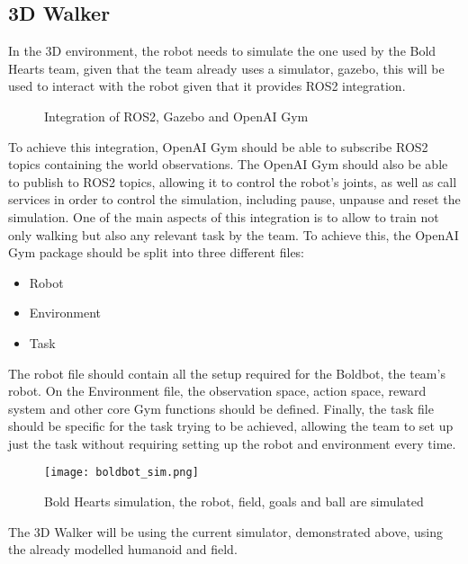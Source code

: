 \subsection{3D Walker}
In the 3D environment, the robot needs to simulate the one used by the Bold Hearts team, given that the team already uses a simulator, gazebo, this will be used to interact with the robot given that it provides ROS2 integration.
\begin{figure}[H]
 \centering
 \caption{Integration of ROS2, Gazebo and OpenAI Gym}
\end{figure}

To achieve this integration, OpenAI Gym should be able to subscribe ROS2 topics containing the world observations. 
The OpenAI Gym should also be able to publish to ROS2 topics, allowing it to control the robot's joints, as well as call services in order to control the simulation, including pause, unpause and reset the simulation.
One of the main aspects of this integration is to allow to train not only walking but also any relevant task by the team. To achieve this, the OpenAI Gym package should be split into three different files:
\begin{itemize}
 \item Robot
 \item Environment
 \item Task
\end{itemize}
The robot file should contain all the setup required for the Boldbot, the team's robot. On the Environment file, the observation space, action space, reward system and other core Gym functions should be defined. 
Finally, the task file should be specific for the task trying to be achieved, allowing the team to set up just the task without requiring setting up the robot and environment every time.
\cite{ros-gym} 

\begin{figure}[H]
 \centering
 \texttt{[image: boldbot\_sim.png]}
 \caption{Bold Hearts simulation, the robot, field, goals and ball are simulated }
\end{figure}

The 3D Walker will be using the current simulator, demonstrated above, using the already modelled humanoid and field.

